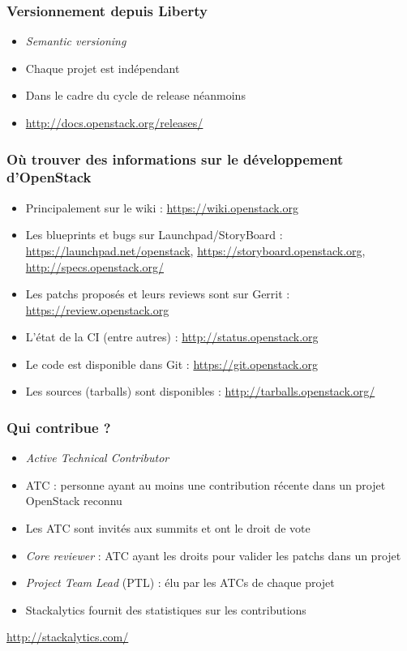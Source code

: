   \begin{frame}
    \frametitle{Versionnement depuis Liberty}
    \begin{itemize}
      \item \textit{Semantic versioning}
      \item Chaque projet est indépendant
      \item Dans le cadre du cycle de release néanmoins
      \item \url{http://docs.openstack.org/releases/}
    \end{itemize}
  \end{frame}

  \begin{frame}
    \frametitle{Où trouver des informations sur le développement d'OpenStack}
    \begin{itemize}
      \item Principalement sur le wiki : \url{https://wiki.openstack.org}
      \item Les blueprints et bugs sur Launchpad/StoryBoard : \url{https://launchpad.net/openstack}, \url{https://storyboard.openstack.org}, \url{http://specs.openstack.org/}
      \item Les patchs proposés et leurs reviews sont sur Gerrit : \url{https://review.openstack.org}
      \item L'état de la CI (entre autres) : \url{http://status.openstack.org}
      \item Le code est disponible dans Git : \url{https://git.openstack.org}
      \item Les sources (tarballs) sont disponibles : \url{http://tarballs.openstack.org/}
    \end{itemize}
  \end{frame}

  \begin{frame}
    \frametitle{Qui contribue ?}
    \begin{itemize}
      \item \textit{Active Technical Contributor}
      \item ATC : personne ayant au moins une contribution récente dans un projet OpenStack reconnu
      \item Les ATC sont invités aux summits et ont le droit de vote
      \item \textit{Core reviewer} : ATC ayant les droits pour valider les patchs dans un projet
      \item \textit{Project Team Lead} (PTL) : élu par les ATCs de chaque projet
      \item Stackalytics fournit des statistiques sur les contributions
    \end{itemize}
    \url{http://stackalytics.com/}
  \end{frame}


